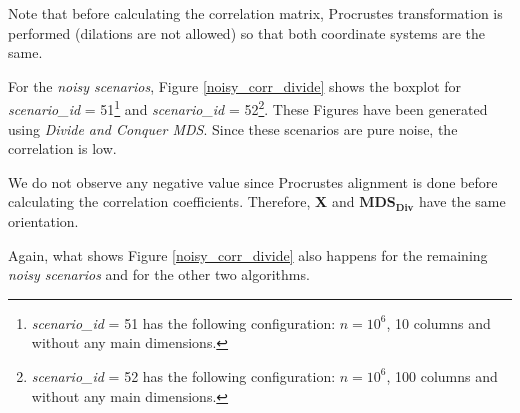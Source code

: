 \documentclass[11pt]{report}
\begin{document}
 

\indent Note that before calculating the correlation matrix, Procrustes 
transformation is performed (dilations are not allowed) so that both coordinate 
systems are the same.


\indent For the \textit{noisy scenarios}, Figure \ref{noisy_corr_divide} 
shows the boxplot for \textit{scenario\_id} = 51\footnote{\textit{scenario\_id} = 51 
has the following configuration: $n=10^6$, 10 columns and without any main 
dimensions.\label{s51}}  and 
\textit{scenario\_id} = 52\footnote{\textit{scenario\_id} = 52 
has the following configuration: $n=10^6$, 100 columns and without any main 
dimensions.\label{s52}}. These Figures have been generated using  
\textit{Divide and Conquer MDS}. Since these scenarios are pure noise, 
the correlation is low. 

\indent We do not observe any negative value since Procrustes alignment 
is done before calculating the correlation coefficients. Therefore, \textbf{X} 
and $\mathbf{MDS_{Div}}$ have the same orientation. 

\indent Again, what shows Figure \ref{noisy_corr_divide} also happens for 
the remaining \textit{noisy scenarios} and for the other two algorithms.
\end{document}
